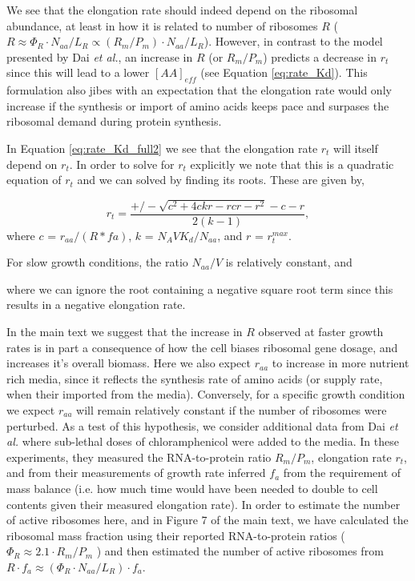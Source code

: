 We see that the elongation rate should indeed depend on the ribosomal abundance,
at least in how it is related to number of ribosomes $R$ ($R \approx \Phi_R
\cdot N_{aa}/ L_R \propto (R_m/P_m) \cdot N_{aa}/ L_R$). However, in contrast to
the model presented by Dai \textit{et al.}, an increase in $R$ (or $R_m/P_m$)
predicts a decrease in $r_t$ since this will lead to a lower $[AA]_{eff}$ (see
Equation \ref{eq:rate_Kd}). This formulation also jibes with an expectation that
the elongation rate would only increase if the synthesis or import of amino
acids keeps pace and surpases the ribosomal demand during protein synthesis.

In Equation \ref{eq:rate_Kd_full2} we see that the elongation rate $r_t$ will
itself depend on $r_t$. In order to solve for $r_t$ explicitly we note that this
is a quadratic equation of $r_t$ and we can solved by finding its roots. These
are given by,

\begin{equation}
r_t = \frac{+/- \sqrt{c^2 + 4 c k r - r cr - r^2} - c - r}{2 (k - 1)},
\label{eq:rt_roots}
\end{equation}
where $c$ = $r_{aa}/ (R*fa)$, $k$ = $N_A V K_d/N_{aa}$, and $r$ = $r_t^{max}$.

For slow growth conditions, the ratio
$N_{aa}/V$ is relatively constant, and


where we can ignore the root containing a negative square root term since this
results in a negative elongation rate.

In the main text we suggest that the increase in $R$ observed at faster growth
rates is in part a consequence of how the cell biases ribosomal gene dosage, and
increases it's overall biomass. Here we also expect $r_{aa}$ to increase in more
nutrient rich media, since it reflects the synthesis rate of amino acids (or
supply rate, when their imported from the media). Conversely, for a specific
growth condition we expect $r_{aa}$ will remain relatively constant if the
number of ribosomes were perturbed. As a test of this hypothesis, we consider
additional data from Dai \textit{et al.} where sub-lethal doses of
chloramphenicol were added to the media. In these experiments,  they measured
the RNA-to-protein ratio $R_m/P_m$, elongation rate $r_t$, and from their
measurements of growth rate inferred $f_a$ from the requirement of mass balance
(i.e. how  much time would have been needed to double to cell contents given
their measured elongation rate). In order to estimate the number of active
ribosomes here, and in Figure 7 of the main text, we have calculated the
ribosomal mass fraction using their reported RNA-to-protein ratios ($\Phi_R
\approx 2.1 \cdot R_m/P_m$ \cite{dai2016}) and then estimated the number of
active ribosomes from $R \cdot f_a \approx (\Phi_R \cdot N_{aa}/ L_R) \cdot
f_a$.



